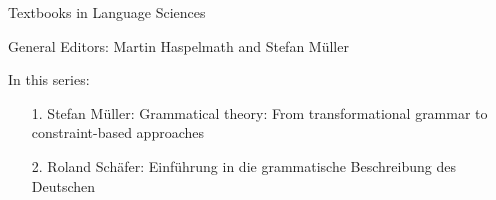 
{\large Textbooks in Language Sciences}

\bigskip

General Editors: Martin Haspelmath and Stefan Müller

\bigskip

In this series:

\begin{enumerate}
\item[1.]\setcounter{enumi}{0} Stefan Müller: Grammatical theory: From transformational grammar to
  constraint-based approaches
\item[2.]\setcounter{enumi}{1} Roland Schäfer: Einführung in die grammatische Beschreibung des Deutschen
\end{enumerate}
